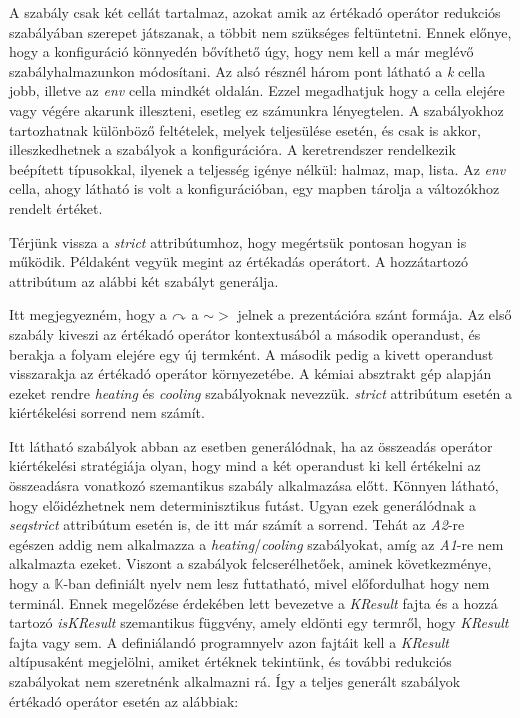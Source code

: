 A szabály csak két cellát tartalmaz, azokat amik az értékadó operátor redukciós szabályában szerepet játszanak, a többit nem szükséges feltüntetni. Ennek előnye, hogy a konfiguráció könnyedén bővíthető úgy, hogy nem kell a már meglévő szabályhalmazunkon módosítani. Az alsó résznél három pont látható a \textit{k} cella jobb, illetve az \textit{env} cella mindkét oldalán. Ezzel megadhatjuk hogy a cella elejére vagy végére akarunk illeszteni, esetleg ez számunkra lényegtelen. A szabályokhoz tartozhatnak különböző feltételek, melyek teljesülése esetén, és csak is akkor, illeszkedhetnek a szabályok a konfigurációra. A keretrendszer rendelkezik beépített típusokkal, ilyenek a teljesség igénye nélkül: halmaz, map, lista. Az \textit{env} cella, ahogy látható is volt a konfigurációban, egy mapben tárolja a változókhoz rendelt értéket.

Térjünk vissza a \textit{strict} attribútumhoz, hogy megértsük pontosan hogyan is működik. Példaként vegyük megint az értékadás operátort. A hozzátartozó attribútum az alábbi két szabályt generálja.



Itt megjegyezném, hogy a $\curvearrowright$ a $\sim>$ jelnek a prezentációra szánt formája. Az első szabály kiveszi az értékadó operátor kontextusából a második operandust, és berakja a folyam elejére egy új termként. A második pedig a kivett operandust visszarakja az értékadó operátor környezetébe. A kémiai absztrakt gép alapján ezeket rendre \textit{heating} és \textit{cooling} szabályoknak nevezzük. \textit{strict} attribútum esetén a kiértékelési sorrend nem számít.



Itt látható szabályok abban az esetben generálódnak, ha az összeadás operátor kiértékelési stratégiája olyan, hogy mind a két operandust ki kell értékelni az összeadásra vonatkozó szemantikus szabály alkalmazása előtt. Könnyen látható, hogy előidézhetnek nem determinisztikus futást. Ugyan ezek generálódnak a \textit{seqstrict} attribútum esetén is, de itt már számít a sorrend. Tehát az \textit{A2}-re egészen addig nem alkalmazza a \textit{heating}/\textit{cooling} szabályokat, amíg az \textit{A1}-re nem alkalmazta ezeket. Viszont a szabályok felcserélhetőek, aminek következménye, hogy a $\mathbb{K}$-ban definiált nyelv nem lesz futtatható, mivel előfordulhat hogy nem terminál. Ennek megelőzése érdekében lett bevezetve a \textit{KResult} fajta és a hozzá tartozó \textit{isKResult} szemantikus függvény, amely eldönti egy termről, hogy \textit{KResult} fajta vagy sem. A definiálandó programnyelv azon fajtáit kell a \textit{KResult} altípusaként megjelölni, amiket értéknek tekintünk, és további redukciós szabályokat nem szeretnénk alkalmazni rá. Így a teljes generált szabályok értékadó operátor esetén az alábbiak:

